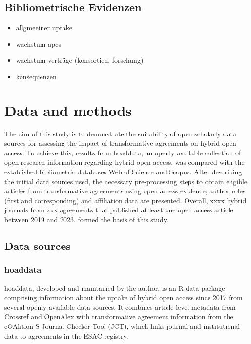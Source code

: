 \documentclass[a4paper,man,floatsintext,longtable,noextraspace,12pt]{apa6}
\providecommand{\tightlist}{%
  \setlength{\itemsep}{0pt}\setlength{\parskip}{0pt}}
\begin{document}
\subsection{Bibliometrische Evidenzen}\label{bibliometrische-evidenzen}

\begin{itemize}
\tightlist
\item
  allgmeeiner uptake
\item
  wachstum apcs
\item
  wachstum verträge (konsortien, forschung)
\item
  konsequenzen
\end{itemize}

\section{Data and methods}\label{data-and-methods}

The aim of this study is to demonstrate the suitability of open
scholarly data sources for assessing the impact of transformative
agreements on hybrid open access. To achieve this, results from
hoaddata, an openly available collection of open research information
regarding hybrid open access, was compared with the established
bibliometric databases Web of Science and Scopus. After describing the
initial data sources used, the necessary pre-processing steps to obtain
eligible articles from transformative agreements using open access
evidence, author roles (first and corresponding) and affiliation data
are presented. Overall, xxxx hybrid journals from xxx agreements that
published at least one open access article between 2019 and 2023. formed
the basis of this study.

\subsection{Data sources}\label{data-sources}

\subsubsection{hoaddata}\label{hoaddata}

hoaddata, developed and maintained by the author, is an R data package
comprising information about the uptake of hybrid open access since 2017
from several openly available data sources. It combines article-level
metadata from Crossref and OpenAlex with transformative agreement
information from the cOAlition S Journal Checker Tool (JCT), which links
journal and institutional data to agreements in the ESAC registry.
\end{document}
